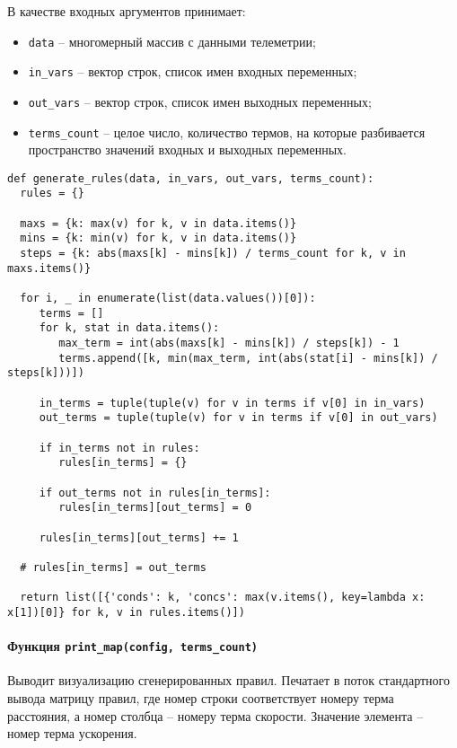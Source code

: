 В качестве входных аргументов принимает:
\begin{itemize}
	\item \lstinline!data! – многомерный массив с данными телеметрии;
	\item \lstinline!in_vars! – вектор строк, список имен входных переменных;
	\item \lstinline!out_vars! – вектор строк, список имен выходных переменных;
	\item \lstinline!terms_count! – целое число, количество термов, на которые разбивается пространство значений входных и выходных переменных.
\end{itemize}

\begin{lstlisting}[style=pythonstyle,caption={  }, label=lst:func:1]
def generate_rules(data, in_vars, out_vars, terms_count):
  rules = {}

  maxs = {k: max(v) for k, v in data.items()}
  mins = {k: min(v) for k, v in data.items()}
  steps = {k: abs(maxs[k] - mins[k]) / terms_count for k, v in maxs.items()}

  for i, _ in enumerate(list(data.values())[0]):
     terms = []
     for k, stat in data.items():
        max_term = int(abs(maxs[k] - mins[k]) / steps[k]) - 1
        terms.append([k, min(max_term, int(abs(stat[i] - mins[k]) / steps[k]))])

     in_terms = tuple(tuple(v) for v in terms if v[0] in in_vars)
     out_terms = tuple(tuple(v) for v in terms if v[0] in out_vars)

     if in_terms not in rules:
        rules[in_terms] = {}

     if out_terms not in rules[in_terms]:
        rules[in_terms][out_terms] = 0

     rules[in_terms][out_terms] += 1

  # rules[in_terms] = out_terms

  return list([{'conds': k, 'concs': max(v.items(), key=lambda x: x[1])[0]} for k, v in rules.items()])
\end{lstlisting}

\paragraph{Функция \lstinline!print_map(config, terms_count)!}

Выводит визуализацию сгенерированных правил. Печатает в поток стандартного вывода матрицу правил, где номер строки соответствует номеру терма расстояния, а номер столбца – номеру терма скорости. Значение элемента – номер терма ускорения.


